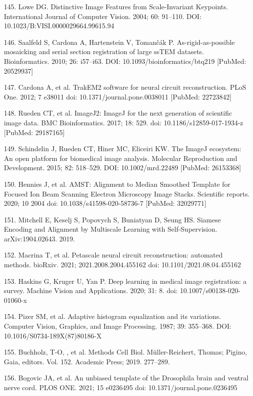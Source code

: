\documentclass{article}
\begin{document}
\begin{hangpars}
145. Lowe DG. Distinctive Image Features from Scale-Invariant Keypoints. International Journal of Computer Vision. 2004; 60: 91–110. DOI: 10.1023/B:VISI.0000029664.99615.94

146. Saalfeld S, Cardona A, Hartenstein V, Tomančák P. As-rigid-as-possible mosaicking and serial section registration of large ssTEM datasets. Bioinformatics. 2010; 26: i57–i63. DOI: 10.1093/bioinformatics/btq219 [PubMed: 20529937]

147. Cardona A, et al. TrakEM2 software for neural circuit reconstruction. PLoS One. 2012; 7 e38011 doi: 10.1371/journal.pone.0038011 [PubMed: 22723842]

148. Rueden CT, et al. ImageJ2: ImageJ for the next generation of scientific image data. BMC Bioinformatics. 2017; 18: 529. doi: 10.1186/s12859-017-1934-z [PubMed: 29187165]

149. Schindelin J, Rueden CT, Hiner MC, Eliceiri KW. The ImageJ ecosystem: An open platform for biomedical image analysis. Molecular Reproduction and Development. 2015; 82: 518–529. DOI: 10.1002/mrd.22489 [PubMed: 26153368]

150. Hennies J, et al. AMST: Alignment to Median Smoothed Template for Focused Ion Beam Scanning Electron Microscopy Image Stacks. Scientific reports. 2020; 10 2004 doi: 10.1038/s41598-020-58736-7 [PubMed: 32029771]

151. Mitchell E, Keselj S, Popovych S, Buniatyan D, Seung HS. Siamese Encoding and Alignment by Multiscale Learning with Self-Supervision. arXiv:1904.02643. 2019.

152. Macrina T, et al. Petascale neural circuit reconstruction: automated methods. bioRxiv. 2021; 2021.2008.2004.455162 doi: 10.1101/2021.08.04.455162

153. Haskins G, Kruger U, Yan P. Deep learning in medical image registration: a survey. Machine Vision and Applications. 2020; 31: 8. doi: 10.1007/s00138-020-01060-x

154. Pizer SM, et al. Adaptive histogram equalization and its variations. Computer Vision, Graphics, and Image Processing. 1987; 39: 355–368. DOI: 10.1016/S0734-189X(87)80186-X

155. Buchholz, T-O, , et al. Methods Cell Biol. Müller-Reichert, Thomas; Pigino, Gaia, editors. Vol. 152. Academic Press; 2019. 277–289.

156. Bogovic JA, et al. An unbiased template of the Drosophila brain and ventral nerve cord. PLOS ONE. 2021; 15 e0236495 doi: 10.1371/journal.pone.0236495


\end{hangpars}
\end{document}

